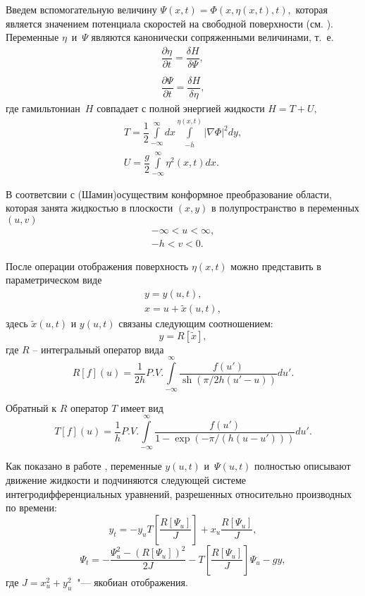 Введем вспомогательную величину $\Psi(x,t)=\Phi(x,\eta(x,t),t),$ которая
является значением потенциала скоростей на свободной поверхности (см.
\cite{DiachZK1996}). Переменные $\eta$~и~$\Psi$ являются канонически сопряженными величинами, т.~е.
\begin{gather*}
\dfrac{\partial\eta}{\partial t}=\dfrac{\delta H}{\delta\Psi},
\\
\\
\dfrac{\partial\Psi}{\partial t}=\dfrac{\delta H}{\delta\eta},
\end{gather*}
где гамильтониан~$H$  совпадает с полной энергией жидкости
$H=T+U,$
\begin{gather*}
T=\dfrac{1}{2}\int\limits_{-\infty}^{\infty}dx\int\limits_{-\overline
h}^{\eta(x,t)} |\nabla\Phi|^2dy,
\\
U=\dfrac{g}{2}\int\limits_{-\infty}^{\infty}\eta^2(x,t)dx.
\end{gather*}

В соответсвии с \cite{DiachZK1996} (Шамин)осуществим конформное преобразование области, которая занята жидкостью в плоскости $(x,y)$ в полупространство в
переменных $(u,v)$
\begin{gather*}
-\infty<u<\infty,\\
-h<v<0.
\end{gather*}

После операции отображения поверхность $\eta(x,t)$ можно представить в параметрическом виде
\begin{gather*}
y=y(u,t),\\
x=u+\tilde x(u,t),
\end{gather*}
здесь $\tilde x(u,t)$ и $y(u,t)$ связаны следующим соотношением:
$$
y=R[\tilde x],
$$
где $R$ -- интегральный оператор вида
$$
R[f](u)=\dfrac{1}{2h}P.V.\int\limits_{-\infty}^{\infty}\dfrac{f(u')}{\operatorname{sh}(\pi/2h(u'-u))}du'.
$$

Обратный к $R$ оператор $T$ имеет вид
$$
T[f](u)=\dfrac{1}{h}P.V.\int\limits_{-\infty}^{\infty}\dfrac{f(u')}{1-\exp(-\pi/(h(u-u')))}du'.
$$

Как показано в работе \cite{DiachZK1996}, переменные $y(u,t)$
и~$\Psi(u,t)$ полностью описывают движение жидкости и подчиняются
следующей системе интегродифференциальных уравнений, разрешенных
относительно производных по времени:
\begin{equation}\label{eq_z1}
y_t=-y_u
T\left[\dfrac{R[\Psi_u]}{J}\right]+x_u\dfrac{R[\Psi_u]}{J},
\end{equation}
\begin{equation}\label{eq_z2}
\Psi_t=-\dfrac{\Psi_u^2 - (R[\Psi_u])^2}{2J}
-T\left[\dfrac{R[\Psi_u]}{J}\right]\Psi_u - gy,
\end{equation}
где $J=x_u^2+y_u^2$~"--- якобиан отображения.

